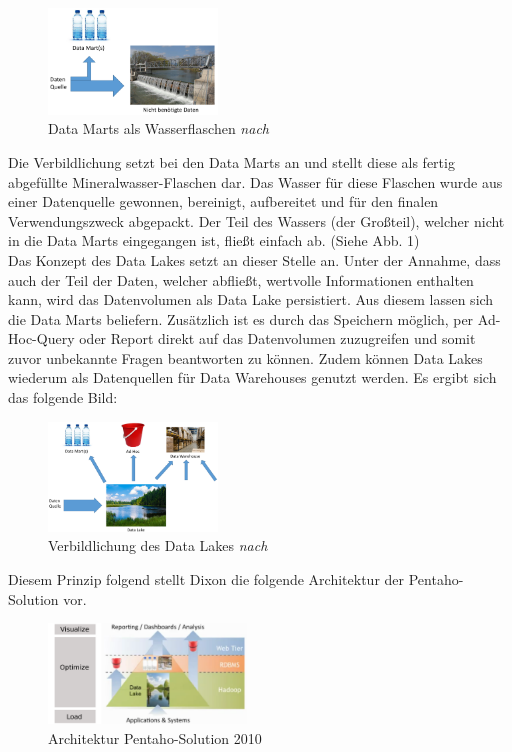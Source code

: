 \documentclass[twoside,twocolumn]{article}
\begin{document}
\begin{figure}[h]
	\centering 
	\includegraphics[width=0.4\textwidth]{img/p1} 
	\caption{Data Marts als Wasserflaschen \textit{nach} \cite{src6}}	
\end{figure}

Die Verbildlichung setzt bei den Data Marts an und stellt diese als fertig abgefüllte Mineralwasser-Flaschen dar. Das Wasser für diese Flaschen wurde aus einer Datenquelle gewonnen, bereinigt, aufbereitet und für den finalen Verwendungszweck abgepackt. Der Teil des Wassers (der Großteil), welcher nicht in die Data Marts eingegangen ist, fließt einfach ab. (Siehe Abb. 1)\\
Das Konzept des Data Lakes setzt an dieser Stelle an. Unter der Annahme, dass auch der Teil der Daten, welcher abfließt, wertvolle Informationen enthalten kann, wird das Datenvolumen als Data Lake persistiert. Aus diesem lassen sich die Data Marts beliefern. Zusätzlich ist es durch das Speichern möglich, per Ad-Hoc-Query oder Report direkt auf das Datenvolumen zuzugreifen und somit zuvor unbekannte Fragen beantworten zu können. Zudem können Data Lakes wiederum als Datenquellen für Data Warehouses genutzt werden. Es ergibt sich das folgende Bild:
\begin{figure}[h]
	\centering 
	\includegraphics[width=0.4\textwidth]{img/p2} 
	\caption{Verbildlichung des Data Lakes \textit{nach} \cite{src6}}	
\end{figure}

\noindent Diesem Prinzip folgend stellt Dixon die folgende Architektur der Pentaho-Solution vor.
\begin{figure}[h]
	\centering 
	\includegraphics[width=0.47\textwidth]{img/p3} 
	\caption{Architektur Pentaho-Solution 2010 \cite{src6b}}	
\end{figure}
\end{document}
